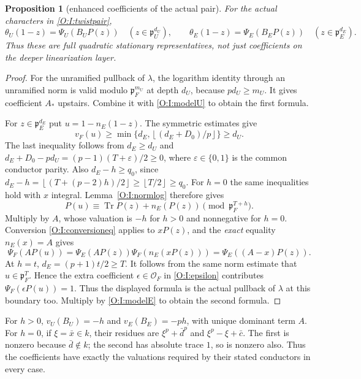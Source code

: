 \documentclass[11pt]{amsart}
\newtheorem{proposition}[theorem]{Proposition}
\theoremstyle{definition}
\theoremstyle{remark}
\newcommand{\Tr}{\operatorname{Tr}}
\newcommand{\floor}[1]{\left\lfloor #1\right\rfloor}
\newcommand{\OO}{\mathcal O}\newcommand{\pp}{\mathfrak p}\newcommand{\PP}{\mathfrak P}
\begin{document}
\begin{proposition}[enhanced coefficients of the actual pair]\label{O:I:actualcoeff}
For the actual characters in \eqref{O:I:twistpair},
\begin{equation}\label{O:I:actualP}
 \theta_U(1-z)=\Psi_U(B_UP(z))\quad(z\in\pp_U^{d_U}),
 \qquad
 \theta_E(1-z)=\Psi_E(B_EP(z))\quad(z\in\pp_E^{d_E}).
\end{equation}
Thus these are full quadratic stationary representatives, not just
coefficients on the deeper linearization layer.
\end{proposition}
\begin{proof}
For the unramified pullback of $\lambda$, the logarithm identity through
an unramified norm is valid modulo $\pp_F^{m_U}$ at depth $d_U$, because
$pd_U\ge m_U$. It gives coefficient $A_*$ upstairs. Combine it with
\eqref{O:I:modelU} to obtain the first formula.

For $z\in\pp_E^{d_E}$ put $u=1-n_E(1-z)$. The symmetric estimates give
\[
 v_F(u)\ge\min\{d_E,\floor{(d_E+D_0)/p}\}\ge d_U.
\]
The last inequality follows from $d_E\ge d_U$ and
$d_E+D_0-pd_U=(p-1)(T+\varepsilon)/2\ge0$, where
$\varepsilon\in\{0,1\}$ is the common conductor parity.
Also $d_E-h\ge q_0$, since
$d_E-h=\floor{(T+(p-2)h)/2}\ge\floor{T/2}\ge q_0$.
For $h=0$ the same inequalities hold with $x$ integral.
Lemma~\ref{O:I:normlog} therefore gives
\[
 P(u)\equiv\Tr P(z)+n_E(P(z))\pmod{\pp_F^{T+h}}.
\]
Multiply by $A$, whose valuation is $-h$ for $h>0$ and nonnegative for
$h=0$. Conversion \eqref{O:I:conversioneq} applies to $xP(z)$, and the
\emph{exact} equality $n_E(x)=A$ gives
\[
 \Psi_F(A P(u))
 =\Psi_E(A P(z))\Psi_F(n_E(xP(z)))
 =\Psi_E((A-x)P(z)).
\]
At $h=t$, $d_E=(p+1)t/2\ge T$. It follows from the same norm estimate
that $u\in\pp_F^T$. Hence the extra coefficient $\epsilon\in\OO_F$ in
\eqref{O:I:epsilon} contributes $\Psi_F(\epsilon P(u))=1$.
Thus the displayed formula is the actual pullback of $\lambda$ at this
boundary too. Multiply by \eqref{O:I:modelE} to obtain the second formula.
\end{proof}

For $h>0$, $v_U(B_U)=-h$ and $v_E(B_E)=-ph$, with unique dominant
term $A$. For $h=0$, if $\xi=\bar x\in k$, their residues are
$\xi^p+\bar d^p$ and $\xi^p-\xi+\bar c$.
The first is nonzero because $\bar d\notin k$; the second has absolute
trace $1$, so is nonzero also. Thus the coefficients have exactly the
valuations required by their stated conductors in every case.
\end{document}
